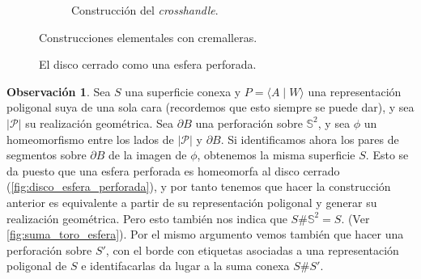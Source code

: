 \documentclass[10pt]{report}
\newcommand{\Esfera}{\mathbb{S}^2}
\theoremstyle{definition}
\newtheorem{obs}[defin]{Observación}
\begin{document}
\begin{figure}
\begin{subfigure}{1\textwidth}
\caption{Construcción del \textit{crosshandle}.\label{fig:crosshandle}}
\end{subfigure}
\caption{Construcciones elementales con cremalleras.}
\end{figure}
\clearpage
%
%
%
%
%

\begin{figure}[h]%
\centering
{}
\caption{El disco cerrado como una esfera perforada.\label{fig:disco_esfera_perforada}}
\end{figure}

\begin{obs}\label{obs:suma_esfera}
Sea $S$ una superficie conexa y $P=\langle A\mid W\rangle$ una representación poligonal suya de una sola cara (recordemos que esto siempre se puede dar), y sea $|\mathcal{P}|$ su realización geométrica. Sea $\partial B$ una perforación sobre $\Esfera$, y sea $\phi$ un homeomorfismo entre los lados de $|\mathcal{P}|$ y $\partial B$. Si identificamos ahora los pares de segmentos sobre $\partial B$ de la imagen de $\phi$, obtenemos la misma superficie $S$. Esto se da puesto que una esfera perforada es homeomorfa al disco cerrado (\autoref{fig:disco_esfera_perforada}), y por tanto tenemos que hacer la construcción anterior es equivalente a partir de su representación poligonal y generar su realización geométrica. Pero esto también nos indica que $S\# \Esfera=S$. (Ver \autoref{fig:suma_toro_esfera}).
Por el mismo argumento vemos también que hacer una perforación sobre $S'$, con el borde con etiquetas asociadas a una representación poligonal de $S$ e identifacarlas da lugar a la suma conexa $S\# S'$. 
\end{obs}
\end{document}
